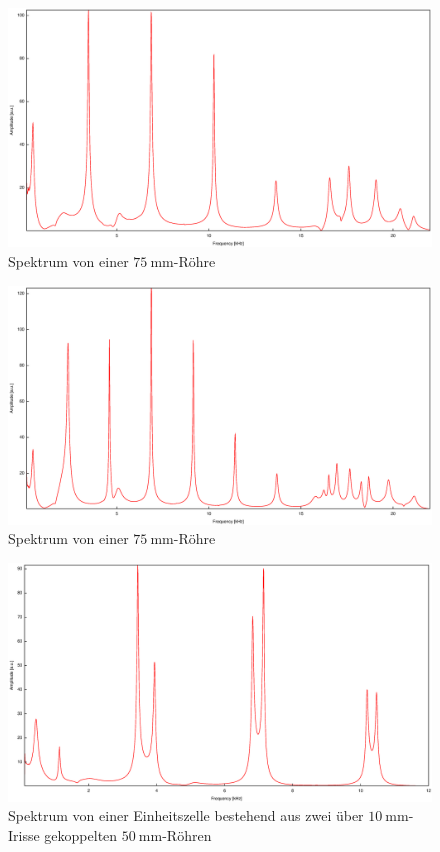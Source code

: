 \begin{figure}
\centering
\includegraphics[width=\linewidth-60pt,height=\textheight-60pt,keepaspectratio]{FP-V23data/4.6_50mm.eps}
\caption{Spektrum von einer $\SI{75}{\milli\meter}$-Röhre}
\label{fig:50mm}
\end{figure}
\begin{figure}
\centering
\includegraphics[width=\linewidth-60pt,height=\textheight-60pt,keepaspectratio]{FP-V23data/4.7_75mm.eps}
\caption{Spektrum von einer $\SI{75}{\milli\meter}$-Röhre}
\label{fig:75mm}
\end{figure}
\begin{figure}
\centering
\includegraphics[width=\linewidth-60pt,height=\textheight-60pt,keepaspectratio]{FP-V23data/4.8_100mm_10mm.eps}
\caption{Spektrum von einer Einheitszelle bestehend aus zwei über $\SI{10}{\milli\meter}$-Irisse gekoppelten $\SI{50}{\milli\meter}$-Röhren}
\label{fig:50_10_50}
\end{figure}
